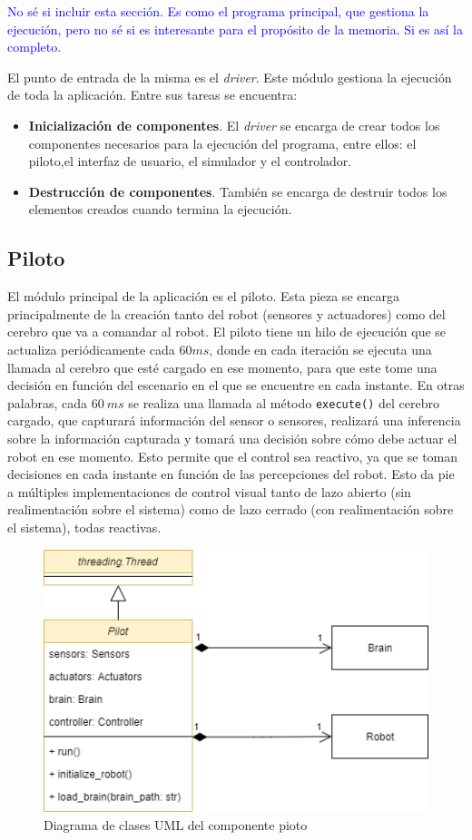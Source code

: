 \textcolor{blue}{No sé si incluir esta sección. Es como el programa principal, que gestiona la ejecución, pero no sé si es interesante para el propósito de la memoria. Si es así la completo.}

El punto de entrada de la misma es el \textit{driver}. Este módulo gestiona la ejecución de toda la aplicación. Entre sus tareas se encuentra:

\begin{itemize}
    \item \textbf{Inicialización de componentes}. El \textit{driver} se encarga de crear todos los componentes necesarios para la ejecución del programa, entre ellos: el piloto,el interfaz de usuario, el simulador y el controlador.
    \item \textbf{Destrucción de componentes}. También se encarga de destruir todos los elementos creados cuando termina la ejecución.
\end{itemize}


\subsection{Piloto}
\label{sec:pilot}

El módulo principal de la aplicación es el piloto. Esta pieza se encarga principalmente de la creación tanto del robot (sensores y actuadores) como del cerebro que va a comandar al robot. El piloto tiene un hilo de ejecución que se actualiza periódicamente cada $ 60 ms $, donde en cada iteración se ejecuta una llamada al cerebro que esté cargado en ese momento, para que este tome una decisión en función del escenario en el que se encuentre en cada instante. En otras palabras, cada $ 60\ ms $ se realiza una llamada al método \lstinline{execute()} del cerebro cargado, que capturará información del sensor o sensores, realizará una inferencia sobre la información capturada y tomará una decisión sobre cómo debe actuar el robot en ese momento. Esto permite que el control sea reactivo, ya que se toman decisiones en cada instante en función de las percepciones del robot. Esto da pie a múltiples implementaciones de control visual tanto de lazo abierto (sin realimentación sobre el sistema) como de lazo cerrado (con realimentación sobre el sistema), todas reactivas.

\begin{figure}
  \centering
  \includegraphics[width=.6\linewidth]{img/pilotuml}
  \caption{Diagrama de clases UML del componente pioto}
  \label{fig:pilotuml}
\end{figure}


